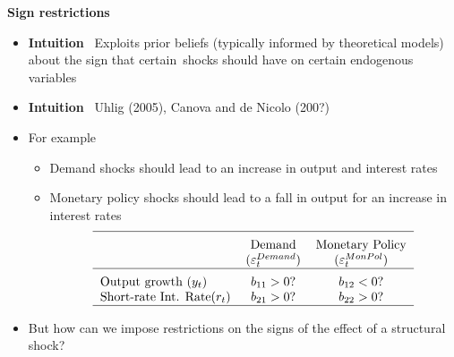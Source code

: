 
\begin{frame}
{\textbf{Sign restrictions}}

\begin{itemize}
\item \textbf{Intuition} \ Exploits prior beliefs (typically informed by
theoretical models) about the sign that certain\smallskip\ shocks should
have on certain endogenous variables\medskip

\item \textbf{Intuition} \ Uhlig (2005), Canova and de Nicolo (200?)\medskip %
\pause

\item For example\smallskip

\begin{itemize}
\item Demand shocks should lead to an increase in output and interest rates
\medskip

\item Monetary policy shocks should lead to a fall in output for an increase
in interest rates 
\begin{equation*}
\begin{tabular}{lcc}
\hline
\addlinespace & Demand & Monetary Policy \\ 
& ($\varepsilon _{t}^{Demand}$) & ($\varepsilon _{t}^{MonPol}$) \\ \hline
\addlinespace Output growth ($y_{t}$) & $b_{11}>0$? & $b_{12}<0$? \\ 
Short-rate Int. Rate($r_{t}$) & $b_{21}>0$? & $b_{22}>0$? \\ \hline
\end{tabular}%
\end{equation*}%
\pause\medskip
\end{itemize}

\item But how can we impose restrictions on the signs of the effect of a
structural shock?
\end{itemize}
\end{frame}


